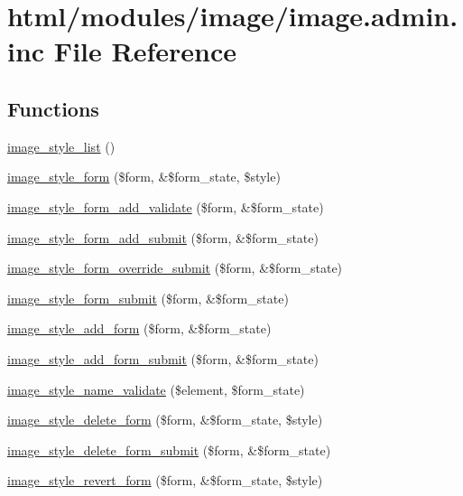 \hypertarget{image_8admin_8inc}{
\section{html/modules/image/image.admin.inc File Reference}
\label{image_8admin_8inc}
}
\subsection*{Functions}
\begin{DoxyCompactItemize}
\item 
\hyperlink{image_8admin_8inc_a1040bda054f5adc80cc8854e3ff26406}{image\_\-style\_\-list} ()
\item 
\hyperlink{group__forms_ga4e39fcf28fa02c59163663ed6fca7d66}{image\_\-style\_\-form} (\$form, \&\$form\_\-state, \$style)
\item 
\hyperlink{image_8admin_8inc_a9576207548aa3eb3c27ffc1caf679be5}{image\_\-style\_\-form\_\-add\_\-validate} (\$form, \&\$form\_\-state)
\item 
\hyperlink{image_8admin_8inc_abdd8225ec447cdd8af9b0b0a4629b2c9}{image\_\-style\_\-form\_\-add\_\-submit} (\$form, \&\$form\_\-state)
\item 
\hyperlink{image_8admin_8inc_a63f14b7dbc720d2bde357c09ee419614}{image\_\-style\_\-form\_\-override\_\-submit} (\$form, \&\$form\_\-state)
\item 
\hyperlink{image_8admin_8inc_a20848bbee768081e10fc4ff75c497e02}{image\_\-style\_\-form\_\-submit} (\$form, \&\$form\_\-state)
\item 
\hyperlink{group__forms_gaee4ef5746d1f8f6e3dda5fae710d4d8d}{image\_\-style\_\-add\_\-form} (\$form, \&\$form\_\-state)
\item 
\hyperlink{image_8admin_8inc_a31634c0c7dfaaf010ad5748f1c39ee15}{image\_\-style\_\-add\_\-form\_\-submit} (\$form, \&\$form\_\-state)
\item 
\hyperlink{image_8admin_8inc_a4f3ad0b45847dc4707cc568e0836107d}{image\_\-style\_\-name\_\-validate} (\$element, \$form\_\-state)
\item 
\hyperlink{group__forms_gae419759130d231f0fa8cc6ef293c2b12}{image\_\-style\_\-delete\_\-form} (\$form, \&\$form\_\-state, \$style)
\item 
\hyperlink{image_8admin_8inc_a9d81773b31a39889eaeb0acd77c72e60}{image\_\-style\_\-delete\_\-form\_\-submit} (\$form, \&\$form\_\-state)
\item 
\hyperlink{image_8admin_8inc_a9a62c6df953ab02bc518b51b1fda7b1c}{image\_\-style\_\-revert\_\-form} (\$form, \&\$form\_\-state, \$style)

\end{DoxyCompactItemize}
